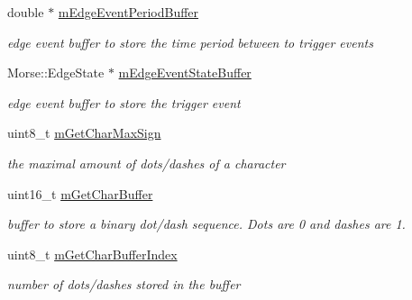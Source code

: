 \begin{DoxyCompactItemize}
double $\ast$ \hyperlink{classMorseDecode_aced6dc0c7d2a22a246e40bd99a8d4fd4}{m\+Edge\+Event\+Period\+Buffer}
\begin{DoxyCompactList}\small\item\em edge event buffer to store the time period between to trigger events \end{DoxyCompactList}\item 
\mbox{\label{classMorseDecode_ac97b8d74d3f264fad8b144f9aec318ac}} 
Morse\+::\+Edge\+State $\ast$ \hyperlink{classMorseDecode_ac97b8d74d3f264fad8b144f9aec318ac}{m\+Edge\+Event\+State\+Buffer}
\begin{DoxyCompactList}\small\item\em edge event buffer to store the trigger event \end{DoxyCompactList}\item 
\mbox{\label{classMorseDecode_a44141d4efcf89ef47cb840846378be2f}} 
uint8\+\_\+t \hyperlink{classMorseDecode_a44141d4efcf89ef47cb840846378be2f}{m\+Get\+Char\+Max\+Sign}
\begin{DoxyCompactList}\small\item\em the maximal amount of dots/dashes of a character \end{DoxyCompactList}\item 
\mbox{\label{classMorseDecode_a2307e6cac8b05e9796e8fa3bcbd78e7f}} 
uint16\+\_\+t \hyperlink{classMorseDecode_a2307e6cac8b05e9796e8fa3bcbd78e7f}{m\+Get\+Char\+Buffer}
\begin{DoxyCompactList}\small\item\em buffer to store a binary dot/dash sequence. Dots are 0 and dashes are 1. \end{DoxyCompactList}\item 
\mbox{\label{classMorseDecode_a65537570d2ea58a43fe4277544442d52}} 
uint8\+\_\+t \hyperlink{classMorseDecode_a65537570d2ea58a43fe4277544442d52}{m\+Get\+Char\+Buffer\+Index}
\begin{DoxyCompactList}\small\item\em number of dots/dashes stored in the buffer \end{DoxyCompactList}\item 
\mbox{\label{classMorseDecode_a9349e48b2482afb76cd4e205f34577d1}} 

\end{DoxyCompactItemize}
